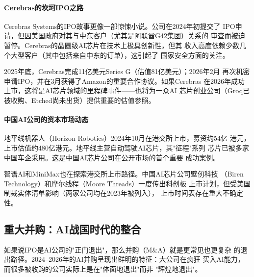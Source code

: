 \paragraph{Cerebras的坎坷IPO之路}

Cerebras Systems的IPO故事更像一部惊悚小说。公司在2024年初提交了
IPO申请，但因美国政府对其与中东客户（尤其是阿联酋G42集团）关系的
审查而被迫暂停。Cerebras的晶圆级AI芯片在技术上极具创新性，但其
收入高度依赖少数几个大型客户（其中包括来自中东的订单），这引起了
国家安全方面的关注。

2025年底，Cerebras完成11亿美元Series G（估值81亿美元）；2026年2月
再次机密申请IPO，并在3月获得了Amazon的重要合作协议。如果Cerebras
在2026年成功上市，这将是AI芯片领域的里程碑事件——也将为一众AI
芯片创业公司（Groq已被收购、Etched尚未出货）提供重要的估值参照。

\paragraph{中国AI公司的资本市场动态}

地平线机器人（Horizon Robotics）2024年10月在港交所上市，募资约54亿
港元，上市估值约480亿港元。地平线主营自动驾驶AI芯片，其"征程"系列
芯片已被多家中国车企采用。这是中国AI芯片公司在公开市场的首个重要
成功案例。

智谱AI和MiniMax也在探索港交所上市路径。中国AI芯片公司壁仞科技
（Biren Technology）和摩尔线程（Moore Threads）一度传出科创板
上市计划，但受美国制裁实体清单影响（两家公司均在2023年被列入），
上市时间表存在重大不确定性。

\subsection{重大并购：AI战国时代的整合}
\label{subsec:fund-ma}

如果说IPO是AI公司的"正门退出"，那么并购（M\&A）就是更常见也更复杂
的退出路径。2024--2026年的AI并购呈现出鲜明的特征：大公司在疯狂
买入AI能力，而很多被收购的公司实际上是在"体面地退出"而非
"辉煌地退出"。


